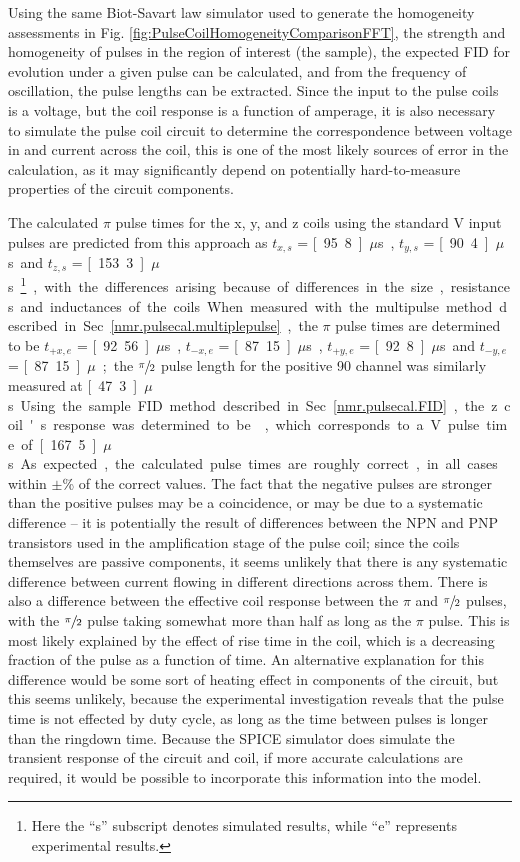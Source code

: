 \documentclass[PaulGanssle-Thesis.tex]{subfiles}
\begin{document}
Using the same Biot-Savart law simulator used to generate the homogeneity assessments in Fig. \ref{fig:PulseCoilHomogeneityComparisonFFT}, the strength and homogeneity of pulses in the region of interest (the sample), the expected FID for evolution under a given pulse can be calculated, and from the frequency of oscillation, the pulse lengths can be extracted. Since the input to the pulse coils is a voltage, but the coil response is a function of amperage, it is also necessary to simulate the pulse coil circuit to determine the correspondence between voltage in and current across the coil, this is one of the most likely sources of error in the calculation, as it may significantly depend on potentially hard-to-measure properties of the circuit components.

The calculated $\pi$ pulse times for the x, y, and z coils using the standard \unit[5]{V} input pulses are predicted from this approach as $t_{x,s}$ = \unit[95.8]{$\mu$s}, $t_{y,s}$ = \unit[90.4]{$\mu$s} and $t_{z,s}$ = \unit[153.3]{$\mu$s}\footnote{Here the ``s'' subscript denotes simulated results, while ``e'' represents experimental results.}, with the differences arising because of differences in the size, resistances and inductances of the coils. When measured with the multipulse method described in Sec. \ref{nmr.pulsecal.multiplepulse}, the $\pi$ pulse times are determined to be $t_{+x,e}$ = \unit[92.56]{$\mu$s}, $t_{-x,e}$ = \unit[87.15]{$\mu$s}, $t_{+y,e}$ = \unit[92.8]{$\mu$s} and $t_{-y,e}$ = \unit[87.15]{$\mu$}; the $\sfrac{\pi}{2}$ pulse length for the positive 90 channel was similarly measured at \unit[47.3]{$\mu$s}. Using the sample FID method described in Sec. \ref{nmr.pulsecal.FID}, the z coil's response was determined to be , which corresponds to a \unit[5]{V} pulse time of \unit[167.5]{$\mu$s}.

As expected, the calculated pulse times are roughly correct, in all cases within $\pm$\unit[10]{\%} of the correct values. The fact that the negative pulses are stronger than the positive pulses may be a coincidence, or may be due to a systematic difference -- it is potentially the result of differences between the NPN and PNP transistors used in the amplification stage of the pulse coil; since the coils themselves are passive components, it seems unlikely that there is any systematic difference between current flowing in different directions across them. There is also a difference between the effective coil response between the $\pi$ and $\sfrac{\pi}{2}$ pulses, with the $\sfrac{\pi}{2}$ pulse taking somewhat more than half as long as the $\pi$ pulse. This is most likely explained by the effect of rise time in the coil, which is a decreasing fraction of the pulse as a function of time. An alternative explanation for this difference would be some sort of heating effect in components of the circuit, but this seems unlikely, because the experimental investigation reveals that the pulse time is not effected by duty cycle, as long as the time between pulses is longer than the ringdown time. Because the SPICE simulator does simulate the transient response of the circuit and coil, if more accurate calculations are required, it would be possible to incorporate this information into the model.
\end{document}
